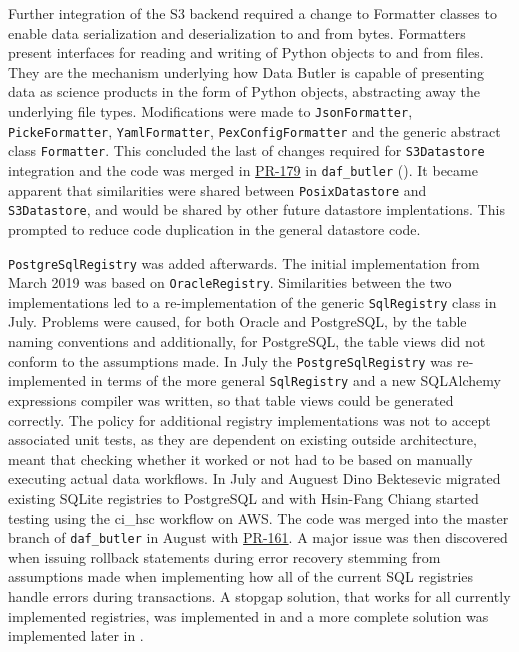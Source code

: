 Further integration of the S3 backend required a change to Formatter classes to enable data serialization and deserialization to and from bytes.
Formatters present interfaces for reading and writing of Python objects to and from files.
They are the mechanism underlying how Data Butler is capable of presenting data as science products in the form of Python objects, abstracting away the underlying file types.
Modifications were made to \texttt{JsonFormatter}, \texttt{PickeFormatter}, \texttt{YamlFormatter}, \texttt{PexConfigFormatter} and the generic abstract class \texttt{Formatter}.
This concluded the last of changes required for \texttt{S3Datastore} integration and the code was merged in \href{https://github.com/lsst/daf_butler/pull/179}{PR-179} in \texttt{daf\_butler} ().
It became apparent that similarities were shared between \texttt{PosixDatastore} and \texttt{S3Datastore}, and would be shared by other future datastore implentations.
This prompted  to reduce code duplication in the general datastore code.

\texttt{PostgreSqlRegistry} was added afterwards.
The initial implementation from March 2019 was based on \texttt{OracleRegistry}.
Similarities between the two implementations led to a re-implementation of the generic \texttt{SqlRegistry} class in July.
Problems were caused, for both Oracle and PostgreSQL, by the table naming conventions and additionally, for PostgreSQL, the table views did not conform to the assumptions made.
In July the \texttt{PostgreSqlRegistry} was re-implemented in terms of the more general \texttt{SqlRegistry} and a new SQLAlchemy expressions compiler was written, so that table views could be generated correctly.
The policy for additional registry implementations was not to accept associated unit tests, as they are dependent on existing outside architecture, meant that checking whether it worked or not had to be based on manually executing actual data workflows.
In July and Auguest Dino Bektesevic migrated existing SQLite registries to PostgreSQL and with Hsin-Fang Chiang started testing using the ci\_hsc workflow on AWS.
The code was merged into the master branch of \texttt{daf\_butler} in August with \href{https://github.com/lsst/daf_butler/pull/161}{PR-161}.
A major issue was then discovered when issuing rollback statements during error recovery stemming from assumptions made when implementing how all of the current SQL registries handle errors during transactions.
A stopgap solution, that works for all currently implemented registries, was implemented in  and a more complete solution was implemented later in .


